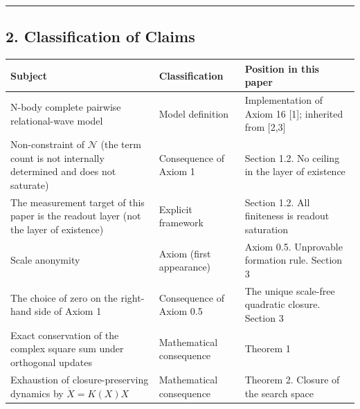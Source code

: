 \documentclass[
  a4paper,
]{article}
\newcounter{none} %
\begin{document}
\begin{center}\rule{0.5\linewidth}{0.5pt}\end{center}

\subsection{2. Classification of Claims}\label{classification-of-claims}

{\def\LTcaptype{none} %
\begin{longtable}[]{@{}
  >{\raggedright\arraybackslash}p{}
  >{\raggedright\arraybackslash}p{}
  >{\raggedright\arraybackslash}p{}@{}}
\toprule\noalign{}
\begin{minipage}[b]{\linewidth}\raggedright
Subject
\end{minipage} & \begin{minipage}[b]{\linewidth}\raggedright
Classification
\end{minipage} & \begin{minipage}[b]{\linewidth}\raggedright
Position in this paper
\end{minipage} \\
\midrule\noalign{}
\endhead
\bottomrule\noalign{}
\endlastfoot
N-body complete pairwise relational-wave model & Model definition &
Implementation of Axiom 16 {[}1{]}; inherited from {[}2,3{]} \\
Non-constraint of \(\mathcal N\) (the term count is not internally
determined and does not saturate) & Consequence of Axiom 1 & Section
1.2. No ceiling in the layer of existence \\
The measurement target of this paper is the readout layer (not the layer
of existence) & Explicit framework & Section 1.2. All finiteness is
readout saturation \\
Scale anonymity & Axiom (first appearance) & Axiom 0.5. Unprovable
formation rule. Section 3 \\
The choice of zero on the right-hand side of Axiom 1 & Consequence of
Axiom 0.5 & The unique scale-free quadratic closure. Section 3 \\
Exact conservation of the complex square sum under orthogonal updates &
Mathematical consequence & Theorem 1 \\
Exhaustion of closure-preserving dynamics by \(\dot X=K(X)X\) &
Mathematical consequence & Theorem 2. Closure of the search space \\

\end{longtable}}
\end{document}
